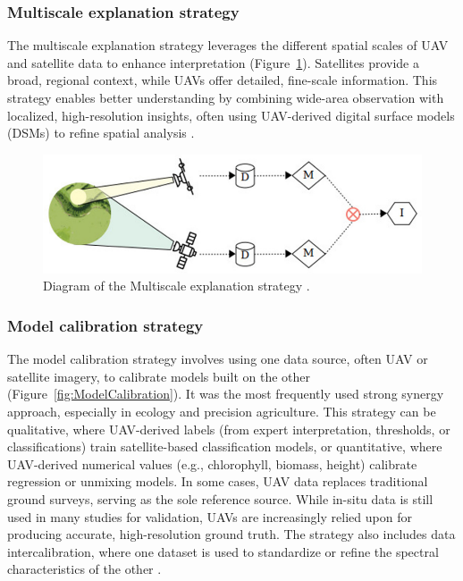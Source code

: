 \subsubsection{Multiscale explanation strategy}
The multiscale explanation strategy leverages the different spatial scales of UAV and satellite data to enhance interpretation (Figure~\ref{fig:MultiscaleExplanation}). Satellites provide a broad, regional context, while UAVs offer detailed, fine-scale information. This strategy enables better understanding by combining wide-area observation with localized, high-resolution insights, often using UAV-derived digital surface models (DSMs) to refine spatial analysis \parencite{AlvarezVanhard2021}.

\begin{figure}[H]
    \centering
    \includegraphics[width=0.8
    \textwidth]{chapters/chapter3/images/Figure13.png}
    \caption{Diagram of the Multiscale explanation strategy \parencite{AlvarezVanhard2021}.}
    \label{fig:MultiscaleExplanation}
\end{figure}

\subsubsection{Model calibration strategy}
The model calibration strategy involves using one data source, often UAV or satellite imagery, to calibrate models built on the other (Figure~\ref{fig:ModelCalibration}). It was the most frequently used strong synergy approach, especially in ecology and precision agriculture. This strategy can be qualitative, where UAV-derived labels (from expert interpretation, thresholds, or classifications) train satellite-based classification models, or quantitative, where UAV-derived numerical values (e.g., chlorophyll, biomass, height) calibrate regression or unmixing models. In some cases, UAV data replaces traditional ground surveys, serving as the sole reference source. While in-situ data is still used in many studies for validation, UAVs are increasingly relied upon for producing accurate, high-resolution ground truth. The strategy also includes data intercalibration, where one dataset is used to standardize or refine the spectral characteristics of the other \parencite{AlvarezVanhard2021}.


